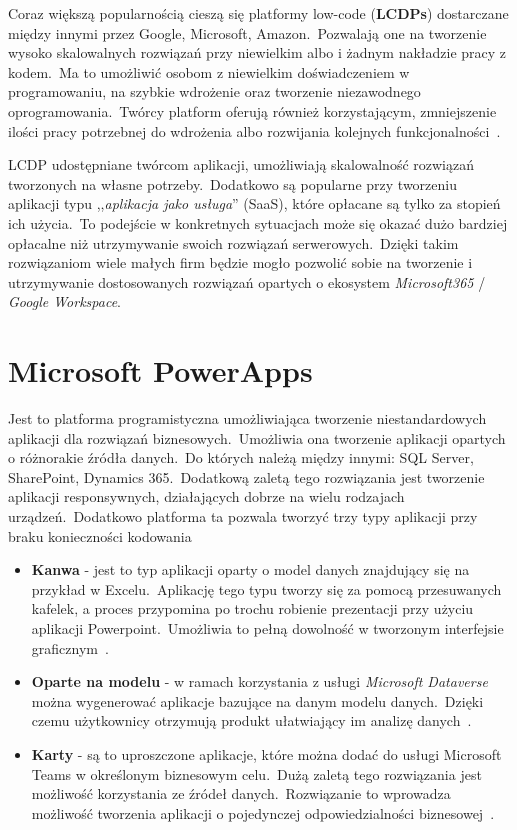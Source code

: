Coraz większą popularnością cieszą się platformy low-code  (\textbf{LCDPs}) dostarczane między innymi przez Google, Microsoft, Amazon.\ Pozwalają one na tworzenie wysoko skalowalnych rozwiązań przy niewielkim albo i żadnym nakładzie pracy z kodem.\ Ma to umożliwić osobom z niewielkim doświadczeniem w programowaniu, na szybkie wdrożenie oraz tworzenie niezawodnego oprogramowania.\ Twórcy platform oferują również korzystającym, zmniejszenie ilości pracy potrzebnej do wdrożenia albo rozwijania kolejnych funkcjonalności~\cite{Bock2021, Hirzel2022}.

LCDP udostępniane twórcom aplikacji, umożliwiają skalowalność rozwiązań tworzonych na własne potrzeby.\ Dodatkowo są popularne przy tworzeniu aplikacji typu ,,\textit{aplikacja jako usługa}''  (SaaS), które opłacane są tylko za stopień ich użycia.\ To podejście w konkretnych sytuacjach może się okazać dużo bardziej opłacalne niż utrzymywanie swoich rozwiązań serwerowych.\ Dzięki takim rozwiązaniom wiele małych firm będzie mogło pozwolić sobie na tworzenie i utrzymywanie dostosowanych rozwiązań opartych o ekosystem \textit{Microsoft365} / \textit{Google Workspace}.



\section{Microsoft PowerApps}
Jest to platforma programistyczna umożliwiająca tworzenie niestandardowych aplikacji dla rozwiązań biznesowych.\ Umożliwia ona tworzenie aplikacji opartych o różnorakie źródła danych.\ Do których należą między innymi: SQL Server, SharePoint, Dynamics 365.\ Dodatkową zaletą tego rozwiązania jest tworzenie aplikacji responsywnych, działających dobrze na wielu rodzajach urządzeń.\ Dodatkowo platforma ta pozwala tworzyć trzy typy aplikacji przy braku konieczności kodowania~\cite{Microsoftc}
\begin{itemize}
    \item \textbf{Kanwa} - jest to typ aplikacji oparty o model danych znajdujący się na przykład w Excelu.\ Aplikację tego typu tworzy się za pomocą przesuwanych kafelek, a proces przypomina po trochu robienie prezentacji przy użyciu aplikacji Powerpoint.\ Umożliwia to pełną dowolność w tworzonym interfejsie graficznym~\cite{Microsoftb}.

    \item \textbf{Oparte na modelu} - w ramach korzystania z usługi \textit{Microsoft Dataverse} można wygenerować aplikacje bazujące na danym modelu danych.\ Dzięki czemu użytkownicy otrzymują produkt ułatwiający im analizę danych~\cite{Microsofta}.

    \item \textbf{Karty} - są to uproszczone aplikacje, które można dodać do usługi Microsoft Teams w określonym biznesowym celu.\ Dużą zaletą tego rozwiązania jest możliwość korzystania ze źródeł danych.\ Rozwiązanie to wprowadza możliwość tworzenia aplikacji o pojedynczej odpowiedzialności biznesowej~\cite{Microsoft}.
\end{itemize}

